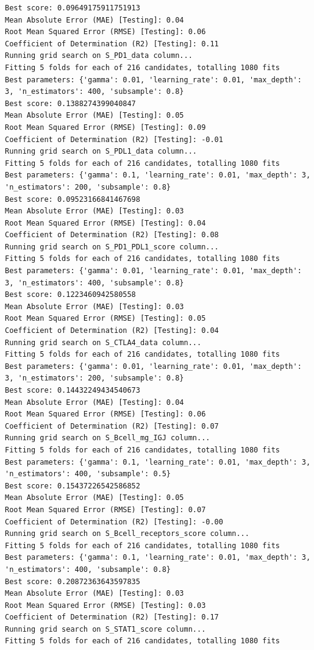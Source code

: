 \documentclass[
  letterpaper,
  DIV=11,
  numbers=noendperiod]{scrartcl}
\begin{document}
\begin{verbatim}
Best score: 0.09649175911751913
Mean Absolute Error (MAE) [Testing]: 0.04
Root Mean Squared Error (RMSE) [Testing]: 0.06
Coefficient of Determination (R2) [Testing]: 0.11
Running grid search on S_PD1_data column...
Fitting 5 folds for each of 216 candidates, totalling 1080 fits
Best parameters: {'gamma': 0.01, 'learning_rate': 0.01, 'max_depth': 3, 'n_estimators': 400, 'subsample': 0.8}
Best score: 0.1388274399040847
Mean Absolute Error (MAE) [Testing]: 0.05
Root Mean Squared Error (RMSE) [Testing]: 0.09
Coefficient of Determination (R2) [Testing]: -0.01
Running grid search on S_PDL1_data column...
Fitting 5 folds for each of 216 candidates, totalling 1080 fits
Best parameters: {'gamma': 0.1, 'learning_rate': 0.01, 'max_depth': 3, 'n_estimators': 200, 'subsample': 0.8}
Best score: 0.09523166841467698
Mean Absolute Error (MAE) [Testing]: 0.03
Root Mean Squared Error (RMSE) [Testing]: 0.04
Coefficient of Determination (R2) [Testing]: 0.08
Running grid search on S_PD1_PDL1_score column...
Fitting 5 folds for each of 216 candidates, totalling 1080 fits
Best parameters: {'gamma': 0.01, 'learning_rate': 0.01, 'max_depth': 3, 'n_estimators': 400, 'subsample': 0.8}
Best score: 0.1223460942580558
Mean Absolute Error (MAE) [Testing]: 0.03
Root Mean Squared Error (RMSE) [Testing]: 0.05
Coefficient of Determination (R2) [Testing]: 0.04
Running grid search on S_CTLA4_data column...
Fitting 5 folds for each of 216 candidates, totalling 1080 fits
Best parameters: {'gamma': 0.01, 'learning_rate': 0.01, 'max_depth': 3, 'n_estimators': 200, 'subsample': 0.8}
Best score: 0.14432249434540673
Mean Absolute Error (MAE) [Testing]: 0.04
Root Mean Squared Error (RMSE) [Testing]: 0.06
Coefficient of Determination (R2) [Testing]: 0.07
Running grid search on S_Bcell_mg_IGJ column...
Fitting 5 folds for each of 216 candidates, totalling 1080 fits
Best parameters: {'gamma': 0.1, 'learning_rate': 0.01, 'max_depth': 3, 'n_estimators': 400, 'subsample': 0.5}
Best score: 0.15437226542586852
Mean Absolute Error (MAE) [Testing]: 0.05
Root Mean Squared Error (RMSE) [Testing]: 0.07
Coefficient of Determination (R2) [Testing]: -0.00
Running grid search on S_Bcell_receptors_score column...
Fitting 5 folds for each of 216 candidates, totalling 1080 fits
Best parameters: {'gamma': 0.1, 'learning_rate': 0.01, 'max_depth': 3, 'n_estimators': 400, 'subsample': 0.8}
Best score: 0.20872363643597835
Mean Absolute Error (MAE) [Testing]: 0.03
Root Mean Squared Error (RMSE) [Testing]: 0.03
Coefficient of Determination (R2) [Testing]: 0.17
Running grid search on S_STAT1_score column...
Fitting 5 folds for each of 216 candidates, totalling 1080 fits

\end{verbatim}
\end{document}
